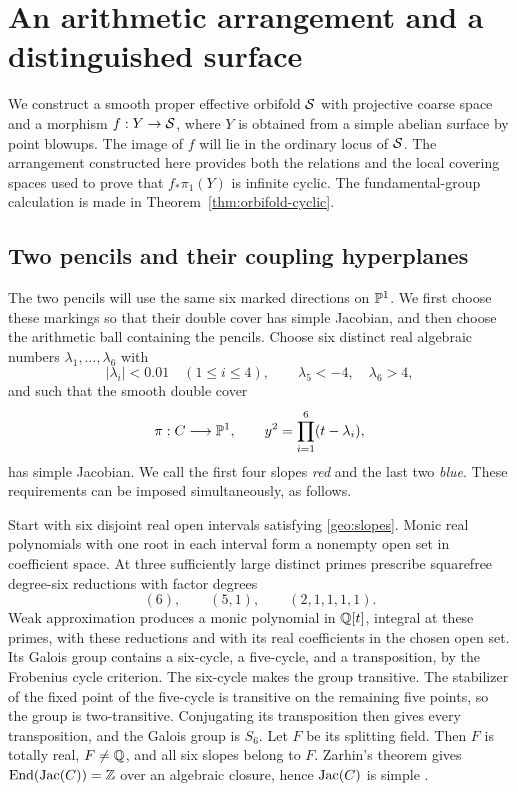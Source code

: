 \section{An arithmetic arrangement and a distinguished surface}\label{sec:geometry}

We construct a smooth proper effective orbifold $\mathcal S$ with projective
coarse space and a morphism $f:Y\to\mathcal S$, where $Y$ is obtained from a
simple abelian surface by point blowups.  The image of $f$ will lie in
the ordinary locus of $\mathcal S$.  The arrangement constructed here provides
both the relations and the local covering spaces used to prove that
$f_*\pi_1(Y)$ is infinite cyclic.  The fundamental-group calculation is
made in Theorem~\ref{thm:orbifold-cyclic}.

\subsection{Two pencils and their coupling hyperplanes}\label{geo:prototype}

The two pencils will use the same six marked directions on $\mathbb P^1$.
We first choose these markings so that their double cover has simple
Jacobian, and then choose the arithmetic ball containing the pencils.
Choose six distinct real algebraic numbers $\lambda_1,\ldots,\lambda_6$ with
\begin{equation}\label{geo:slopes}
 |\lambda_i|<0.01\quad(1\le i\le4),
 \qquad \lambda_5<-4,\quad \lambda_6>4,
\end{equation}
and such that the smooth double cover
\begin{equation}\label{geo:curve}
 \pi:C\longrightarrow\mathbb P^1,
 \qquad y^2=\prod_{i=1}^6(t-\lambda_i),
\end{equation}
has simple Jacobian.  We call the first four slopes \emph{red} and the
last two \emph{blue}.  These requirements can be imposed simultaneously,
as follows.

Start with six disjoint real open intervals satisfying
\eqref{geo:slopes}.  Monic real polynomials with one root in each interval
form a nonempty open set in coefficient space.  At three sufficiently
large distinct primes prescribe squarefree degree-six reductions with
factor degrees
\[
 (6),\qquad(5,1),\qquad(2,1,1,1,1).
\]
Weak approximation produces a monic polynomial in $\mathbb Q[t]$, integral at
these primes, with these reductions and with its real coefficients in
the chosen open set.  Its Galois group contains a six-cycle, a five-cycle,
and a transposition, by the Frobenius cycle criterion.  The six-cycle
makes the group transitive.  The stabilizer of the fixed point of the
five-cycle is transitive on the remaining five points, so the group is
two-transitive.  Conjugating its transposition then gives every
transposition, and the Galois group is $S_6$.  Let $F$ be its splitting
field.  Then $F$ is totally real, $F\ne\mathbb Q$, and all six slopes belong
to $F$.  Zarhin's theorem gives
$\operatorname{End}(\operatorname{Jac}(C))=\mathbb Z$ over an algebraic closure, hence $\operatorname{Jac}(C)$ is simple
\cite[Theorem~2.1]{Zarhin}.

